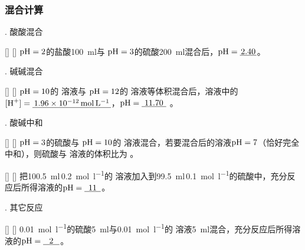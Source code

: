         \subsubsection{混合计算}\label{subsubsec:混合计算}

        . 酸酸混合

            \begin{xmp}
                [pH 计算例七]
                {}
                []
                []
                \(\cemh{pH}=2\)的盐酸\SI{100}{\ml}与 \(\cemh{pH}=3\)的硫酸\SI{200}{\ml}混合后，\(\cemh{pH}=\uline{\makebox[2em]{2.40}}\)。
            \end{xmp}

        . 碱碱混合

            \begin{xmp}
                [pH 计算例八]
                {}
                []
                []
                \(\cemh{pH}=10\)的  溶液与 \(\cemh{pH}=12\)的  溶液等体积混合后，溶液中的\(\cemh{[H+]}=\uline{\makebox[9.5em]{\SI{1.96E-12}{\mole\per\litre}}}\)，\(\cemh{pH}=\uline{\makebox[3em]{11.70}}\) 。
            \end{xmp}

        . 酸碱中和

            \begin{xmp}
                [pH 计算例九]
                {}
                []
                []
                \(\cemh{pH}=3\)的硫酸与 \(\cemh{pH}=10\)的  溶液混合，若要混合后的溶液\(\cemh{pH}=7\)（恰好完全中和），则硫酸与  溶液的体积比为\uline{} 。
            \end{xmp}

            \begin{xmp}
                [pH 计算例十]
                {}
                []
                []
                把\SI{100.5}{\ml}\,\SI{0.2}{\mole\per\litre}的  溶液加入到\SI{99.5}{\ml}\,\SI{0.1}{\mole\per\litre}的硫酸中，充分反应后所得溶液的\(\cemh{pH}=\uline{\makebox[2em]{11}} \)。
            \end{xmp}

        . 其它反应

            \begin{xmp}
                [pH 计算例十一]
                {}
                []
                []
                \SI{0.01}{\mole\per\litre}的硫酸\SI{5}{\ml}与\SI{0.01}{\mole\per\litre}的  溶液\SI{5}{\ml}混合，充分反应后所得溶液的\(\cemh{pH}=\uline{\makebox[2em]{2}}\)。
            \end{xmp}

